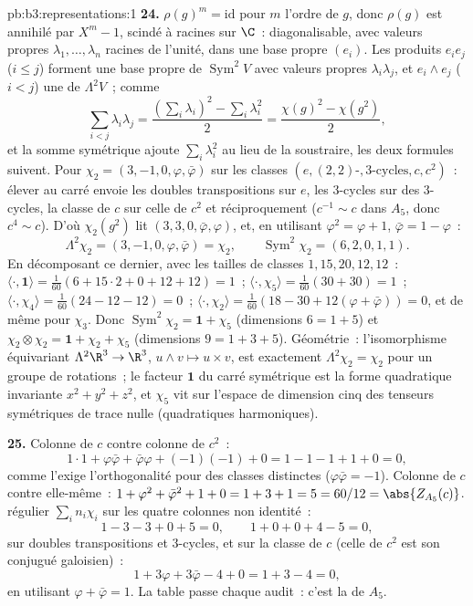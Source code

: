 \begin{solution}{pb:b3:representations:1}
\textbf{24.} $\rho(g)^m = \mathrm{id}$ pour $m$ l'ordre de
$g$, donc $\rho(g)$ est annihilé par $X^m - 1$, scindé à
racines  sur $\C$~: diagonalisable, avec valeurs propres
$\lambda_1, \dots, \lambda_n$ racines de l'unité, dans une
base propre $(e_i)$. Les produits $e_ie_j$ ($i \leq j$)
forment une base propre de $\operatorname{Sym}^2V$ avec
valeurs propres $\lambda_i\lambda_j$, et $e_i \wedge e_j$ ($i
< j$) une de $\Lambda^2V$~; comme
\[
\sum_{i<j}\lambda_i\lambda_j
= \frac{(\sum_i\lambda_i)^2 - \sum_i\lambda_i^2}2
= \frac{\chi(g)^2 - \chi(g^2)}2,
\]
et la somme symétrique ajoute $\sum_i\lambda_i^2$ au lieu de
la soustraire, les deux formules suivent. Pour $\chi_2 = (3,
-1, 0, \varphi, \bar\varphi)$ sur les classes $(e,
(2,2)\text{-}, 3\text{-cycles}, c, c^2)$~: élever au carré
envoie les doubles transpositions sur $e$, les $3$-cycles sur
des $3$-cycles, la classe de $c$ sur celle de $c^2$ et
réciproquement ($c^{-1} \sim c$ dans $A_5$, donc $c^4 \sim
c$). D'où $\chi_2(g^2)$ lit $(3, 3, 0, \bar\varphi,
\varphi)$, et, en utilisant $\varphi^2 = \varphi + 1$,
$\bar\varphi = 1 - \varphi$~:
\[
\Lambda^2\chi_2 = (3, -1, 0, \varphi, \bar\varphi) = \chi_2,
\qquad
\operatorname{Sym}^2\chi_2 = (6, 2, 0, 1, 1) .
\]
En décomposant ce dernier, avec les tailles de classes $1, 15,
20, 12, 12$~: $\langle\cdot, \mathbf 1\rangle = \frac1{60}(6 +
15\cdot2 + 0 + 12 + 12) = 1$~; $\langle\cdot, \chi_5\rangle =
\frac1{60}(30 + 30) = 1$~; $\langle\cdot, \chi_4\rangle =
\frac1{60}(24 - 12 - 12) = 0$~; $\langle\cdot, \chi_2\rangle =
\frac1{60}(18 - 30 + 12(\varphi + \bar\varphi)) = 0$, et de
même pour $\chi_3$. Donc $\operatorname{Sym}^2\chi_2 =
\mathbf 1 + \chi_5$ (dimensions $6 = 1 + 5$) et
$\chi_2\otimes\chi_2 = \mathbf 1 + \chi_2 + \chi_5$
(dimensions $9 = 1 + 3 + 5$). Géométrie~: l'isomorphisme
équivariant $\Lambda^2\R^3 \to \R^3$, $u \wedge v \mapsto u
\times v$, est exactement $\Lambda^2\chi_2 = \chi_2$ pour un
groupe de rotations~; le facteur $\mathbf 1$ du carré
symétrique est la forme quadratique invariante $x^2 + y^2 +
z^2$, et $\chi_5$ vit sur l'espace de dimension cinq des
tenseurs symétriques de trace nulle (quadratiques
harmoniques).

\textbf{25.} Colonne de $c$ contre colonne de $c^2$~:
\[
1\cdot1 + \varphi\bar\varphi + \bar\varphi\varphi +
(-1)(-1) + 0 = 1 - 1 - 1 + 1 + 0 = 0,
\]
comme l'exige l'orthogonalité pour des classes distinctes
($\varphi \bar\varphi = -1$). Colonne de $c$ contre
elle-même~: $1 + \varphi^2 + \bar\varphi^2 + 1 + 0 = 1 + 3 +
1 = 5 = 60/12 = \abs{Z_{A_5}(c)}$.  régulier
$\sum_in_i\chi_i$ sur les quatre colonnes non identité~:
\[
1 - 3 - 3 + 0 + 5 = 0, \qquad
1 + 0 + 0 + 4 - 5 = 0,
\]
sur doubles transpositions et $3$-cycles, et sur la classe de
$c$ (celle de $c^2$ est son conjugué galoisien)~:
\[
1 + 3\varphi + 3\bar\varphi - 4 + 0 = 1 + 3 - 4 = 0,
\]
en utilisant $\varphi + \bar\varphi = 1$. La table passe
chaque audit~: c'est la  de $A_5$.
\end{solution}
